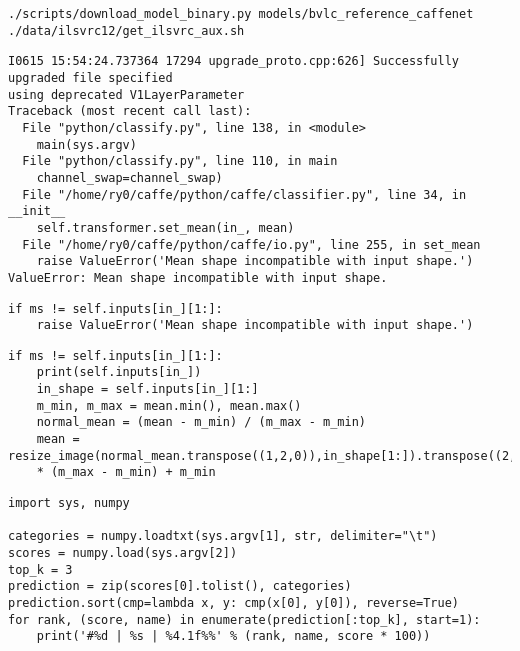 \documentclass[a4paper,10pt]{jsarticle}
\begin{document}
\begin{lstlisting}[basicstyle=\ttfamily\footnotesize, frame=single]
./scripts/download_model_binary.py models/bvlc_reference_caffenet
./data/ilsvrc12/get_ilsvrc_aux.sh
\end{lstlisting}

\begin{lstlisting}[basicstyle=\ttfamily\footnotesize, frame=single]
I0615 15:54:24.737364 17294 upgrade_proto.cpp:626] Successfully upgraded file specified
using deprecated V1LayerParameter
Traceback (most recent call last):
  File "python/classify.py", line 138, in <module>
    main(sys.argv)
  File "python/classify.py", line 110, in main
    channel_swap=channel_swap)
  File "/home/ry0/caffe/python/caffe/classifier.py", line 34, in __init__
    self.transformer.set_mean(in_, mean)
  File "/home/ry0/caffe/python/caffe/io.py", line 255, in set_mean
    raise ValueError('Mean shape incompatible with input shape.')
ValueError: Mean shape incompatible with input shape.
\end{lstlisting}

\begin{lstlisting}[basicstyle=\ttfamily\footnotesize, frame=single]
if ms != self.inputs[in_][1:]:
    raise ValueError('Mean shape incompatible with input shape.')
\end{lstlisting}

\begin{lstlisting}[basicstyle=\ttfamily\footnotesize, frame=single]
if ms != self.inputs[in_][1:]:
    print(self.inputs[in_])
    in_shape = self.inputs[in_][1:]
    m_min, m_max = mean.min(), mean.max()
    normal_mean = (mean - m_min) / (m_max - m_min)
    mean = resize_image(normal_mean.transpose((1,2,0)),in_shape[1:]).transpose((2,0,1))
    * (m_max - m_min) + m_min
\end{lstlisting}

\begin{lstlisting}[basicstyle=\ttfamily\footnotesize, frame=single]
import sys, numpy

categories = numpy.loadtxt(sys.argv[1], str, delimiter="\t")
scores = numpy.load(sys.argv[2])
top_k = 3
prediction = zip(scores[0].tolist(), categories)
prediction.sort(cmp=lambda x, y: cmp(x[0], y[0]), reverse=True)
for rank, (score, name) in enumerate(prediction[:top_k], start=1):
    print('#%d | %s | %4.1f%%' % (rank, name, score * 100))
\end{lstlisting}
\end{document}
